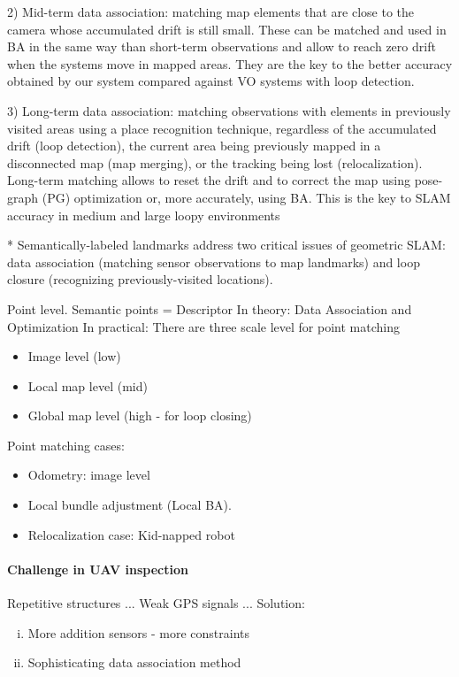 \documentclass[review]{elsarticle}
\begin{document}
2) Mid-term data association: matching map elements that are close to the camera whose accumulated drift is still small. These can be matched and used in BA in the same way than short-term observations and allow to reach zero drift when the systems move in mapped areas. They are the key to the better accuracy obtained by our system compared against VO systems with loop detection.

3) Long-term data association: matching observations with elements in previously visited areas using a place recognition technique, regardless of the accumulated drift (loop detection), the current area being previously mapped in a disconnected map (map merging), or the tracking being lost (relocalization). Long-term matching allows to reset the drift and to correct the map using pose-graph (PG) optimization or, more accurately, using BA. This is the key to SLAM accuracy in medium and large loopy environments


* Semantically-labeled landmarks address two critical issues of geometric SLAM: data association (matching sensor observations to map landmarks) and loop closure (recognizing previously-visited locations).

Point level.
Semantic points = Descriptor
In theory: Data Association and Optimization
In practical: There are three scale level for point matching

\begin{itemize}
	\item Image level (low)
	\item Local map level (mid)
	\item Global map level (high - for loop closing)
\end{itemize}

Point matching cases:
\begin{itemize}
	\item Odometry: image level
	\item Local bundle adjustment (Local BA).
	\item Relocalization case: Kid-napped robot
\end{itemize}

\paragraph{Challenge in UAV inspection} 
Repetitive structures ...
Weak GPS signals ...
Solution: 
\begin{enumerate}[(i)]
	\item More addition sensors - more constraints
	\item Sophisticating data association method
\end{enumerate}
\end{document}

